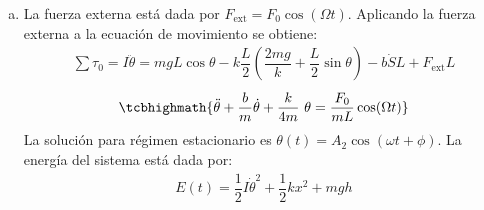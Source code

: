 \begin{enumerate}[a)]
	\item La fuerza externa está dada por $F_\text{ext} = F_0 \cos (\Omega t)$. Aplicando la fuerza externa a la ecuación de movimiento se obtiene:
	\begin{align*}
	\sum \tau_0 = I\ddot{\theta} = mgL\cos \theta - k \dfrac{L}{2} \left( \dfrac{2mg}{k} + \dfrac{L}{2} \sin \theta \right) - b \dot{S} L + F_{\text{ext}}L
	\end{align*}
	\begin{align*}
	\tcbhighmath{\ddot{\theta} + \dfrac{b}{m} \dot{\theta} + \frac{k}{4m} \ \theta = \dfrac{F_0}{mL} \cos (\Omega t)}
	\end{align*}
	La solución para régimen estacionario es $\theta(t) = A_2 \cos (\omega t + \phi)$. La energía del sistema está dada por:
	\begin{align*}
	E(t) = \dfrac{1}{2} I \dot{\theta}^2 + \dfrac{1}{2} k x^2 + mgh
	\end{align*}
	
\end{enumerate}
